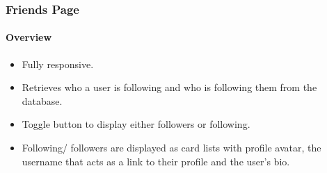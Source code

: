 \subsubsection{Friends Page} 
\paragraph{Overview\newline}
\begin{itemize}
    \item Fully responsive.
    \item Retrieves who a user is following and who is following them from the database.
    \item Toggle button to display either followers or following.
    \item Following/ followers are displayed as card lists with profile avatar, the username that acts as a link to their profile and the user's bio.
\end{itemize}

